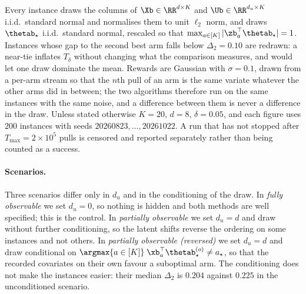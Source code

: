 %
%
%

Every instance draws the columns of $\Xb\in\RR^{d\times K}$ and
$\Ub\in\RR^{d_u\times K}$ i.i.d.\ standard normal and normalises them to unit
$\ell_2$ norm, and draws $\thetab_\star$ i.i.d.\ standard normal, rescaled so
that $\max_{a\in[K]}|\zb_a^\top\thetab_\star|=1$.  Instances whose gap to the
second best arm falls below $\Delta_2=0.10$ are redrawn: a near-tie inflates
$T_\delta$ without changing what the comparison measures, and would let one
draw dominate the mean.  Rewards are Gaussian with $\sigma=0.1$, drawn from a
per-arm stream so that the $n$th pull of an arm is the same variate whatever
the other arms did in between; the two algorithms therefore run on the same
instances with the same noise, and a difference between them is never a
difference in the draw.  Unless stated otherwise $K=20$, $d=8$, $\delta=0.05$,
and each figure uses $200$ instances with seeds $20260823,\dots,20261022$.  A
run that has not stopped after $T_{\max}=2\times10^5$ pulls is censored and
reported separately rather than being counted as a success.

\paragraph{Scenarios.}
Three scenarios differ only in $d_u$ and in the conditioning of the draw.  In
\emph{fully observable} we set $d_u=0$, so nothing is hidden and both methods
are well specified; this is the control.  In \emph{partially observable} we set
$d_u=d$ and draw without further conditioning, so the latent shifts reverse the
ordering on some instances and not others.  In \emph{partially observable
(reversed)} we set $d_u=d$ and draw conditional on
$\argmax{a\in[K]}\;\xb_a^\top\thetab_\star^{(o)}\neq a_\star$, so that the
recorded covariates on their own favour a suboptimal arm.  The conditioning
does not make the instances easier: their median $\Delta_2$ is $0.204$ against
$0.225$ in the unconditioned scenario.

